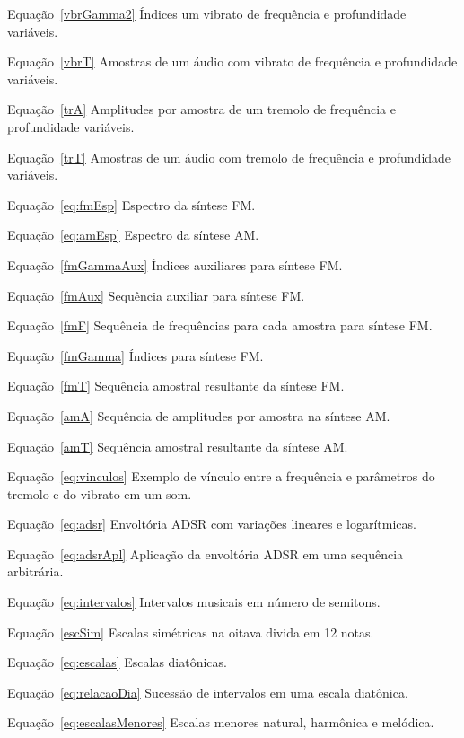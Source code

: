 \begin{listaespecial}[BIGNAMEWIDTH]
        \item[Equação~\ref{vbrGamma2}] Índices um vibrato de frequência e profundidade variáveis.
        \item[Equação~\ref{vbrT}] Amostras de um áudio com vibrato de frequência e profundidade variáveis.
        \item[Equação~\ref{trA}] Amplitudes por amostra de um tremolo de frequência e profundidade variáveis.
        \item[Equação~\ref{trT}] Amostras de um áudio com tremolo de frequência e profundidade variáveis.
        \item[Equação~\ref{eq:fmEsp}] Espectro da síntese FM.
        \item[Equação~\ref{eq:amEsp}] Espectro da síntese AM.
        \item[Equação~\ref{fmGammaAux}] Índices auxiliares para síntese FM.
        \item[Equação~\ref{fmAux}] Sequência auxiliar para síntese FM.
        \item[Equação~\ref{fmF}] Sequência de frequências para cada amostra para síntese FM.
        \item[Equação~\ref{fmGamma}] Índices para síntese FM.
        \item[Equação~\ref{fmT}] Sequência amostral resultante da síntese FM.
        \item[Equação~\ref{amA}] Sequência de amplitudes por amostra na síntese AM.
        \item[Equação~\ref{amT}] Sequência amostral resultante da síntese AM.
        \item[Equação~\ref{eq:vinculos}] Exemplo de vínculo entre a frequência e parâmetros do tremolo e do vibrato em um som.
        \item[Equação~\ref{eq:adsr}] Envoltória ADSR com variações lineares e logarítmicas.
        \item[Equação~\ref{eq:adsrApl}] Aplicação da envoltória ADSR em uma sequência arbitrária.
        \item[Equação~\ref{eq:intervalos}] Intervalos musicais em número de semitons.
        \item[Equação~\ref{escSim}] Escalas simétricas na oitava divida em 12 notas.
        \item[Equação~\ref{eq:escalas}] Escalas diatônicas.
        \item[Equação~\ref{eq:relacaoDia}] Sucessão de intervalos em uma escala diatônica.
        \item[Equação~\ref{eq:escalasMenores}] Escalas menores natural, harmônica e melódica.

\end{listaespecial}
